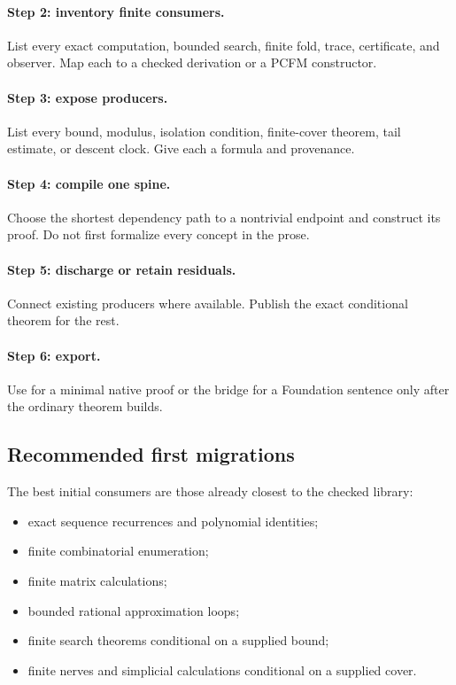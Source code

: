 \paragraph{Step 2: inventory finite consumers.}
List every exact computation, bounded search, finite fold, trace, certificate,
and observer.  Map each to a checked derivation or a PCFM constructor.

\paragraph{Step 3: expose producers.}
List every bound, modulus, isolation condition, finite-cover theorem, tail
estimate, or descent clock.  Give each a formula and provenance.

\paragraph{Step 4: compile one spine.}
Choose the shortest dependency path to a nontrivial endpoint and construct its
 proof.  Do not first formalize every concept in the prose.

\paragraph{Step 5: discharge or retain residuals.}
Connect existing producers where available.  Publish the exact conditional
theorem for the rest.

\paragraph{Step 6: export.}
Use  for a minimal native proof or the bridge for a
Foundation sentence only after the ordinary theorem builds.

\subsection{Recommended first migrations}

The best initial consumers are those already closest to the checked library:

\begin{itemize}
\item exact sequence recurrences and polynomial identities;
\item finite combinatorial enumeration;
\item finite matrix calculations;
\item bounded rational approximation loops;
\item finite search theorems conditional on a supplied bound;
\item finite nerves and simplicial calculations conditional on a supplied
cover.
\end{itemize}

